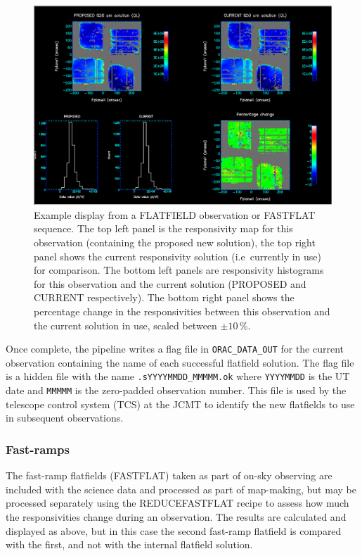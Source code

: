 \documentclass[twoside,11pt]{article}
\renewcommand{\_}{\texttt{\symbol{95}}}
\newcommand{\task}[1]{\textsf{#1}}
\begin{document}
\begin{figure}[t]
\centering
\includegraphics[width=\textwidth]{sun264_flatfield.eps}
\caption{Example display from a FLATFIELD observation or FASTFLAT
  sequence. The top left panel is the responsivity map for this
  observation (containing the proposed new solution), the top right
  panel shows the current responsivity solution (i.e\ currently in
  use) for comparison. The bottom left panels are responsivity
  histograms for this observation and the current solution (PROPOSED
  and CURRENT respectively). The bottom right panel shows the
  percentage change in the responsivities between this observation and
  the current solution in use, scaled between
  $\pm10$\,\%.\label{fig:flatfield}}
\end{figure}

Once complete, the pipeline writes a flag file in
\verb+ORAC_DATA_OUT+ for the current observation containing the name
of each successful flatfield solution. The flag file is a hidden file
with the name \verb+.sYYYYMMDD_MMMMM.ok+ where \verb+YYYYMMDD+ is the
UT date and \verb+MMMMM+ is the zero-padded observation number. This
file is used by the telescope control system (TCS) at the JCMT to
identify the new flatfields to use in subsequent observations.

\subsubsection{Fast-ramps}

The fast-ramp flatfields (FASTFLAT) taken as part of on-sky observing
are included with the science data and processed as part of
map-making, but may be processed separately using the
\task{REDUCE\_FASTFLAT} recipe to assess how much the responsivities
change during an observation. The results are calculated and displayed
as above, but in this case the second fast-ramp flatfield is compared
with the first, and not with the internal flatfield solution.
\end{document}
